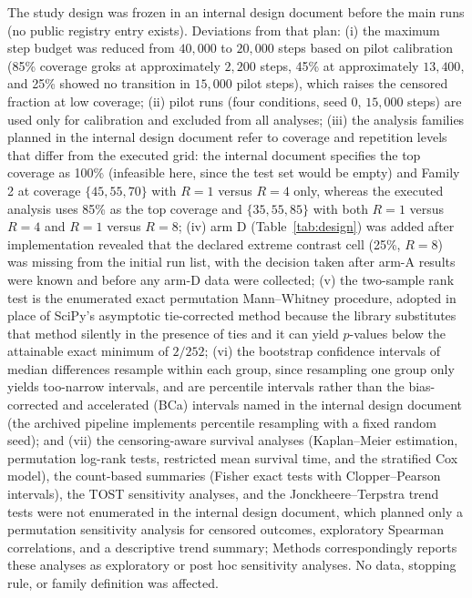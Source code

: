 \documentclass[10pt]{article}
\begin{document}
The study design was frozen in an internal design document before the main runs (no public registry entry exists). Deviations from that plan: (i) the maximum step budget was reduced from $40{,}000$ to $20{,}000$ steps based on pilot calibration (85\% coverage groks at approximately $2{,}200$ steps, 45\% at approximately $13{,}400$, and 25\% showed no transition in $15{,}000$ pilot steps), which raises the censored fraction at low coverage; (ii) pilot runs (four conditions, seed 0, $15{,}000$ steps) are used only for calibration and excluded from all analyses; (iii) the analysis families planned in the internal design document refer to coverage and repetition levels that differ from the executed grid: the internal document specifies the top coverage as 100\% (infeasible here, since the test set would be empty) and Family 2 at coverage $\{45,55,70\}$ with $R=1$ versus $R=4$ only, whereas the executed analysis uses 85\% as the top coverage and $\{35,55,85\}$ with both $R=1$ versus $R=4$ and $R=1$ versus $R=8$; (iv) arm D (Table~\ref{tab:design}) was added after implementation revealed that the declared extreme contrast cell (25\%, $R=8$) was missing from the initial run list, with the decision taken after arm-A results were known and before any arm-D data were collected; (v) the two-sample rank test is the enumerated exact permutation Mann--Whitney procedure, adopted in place of SciPy's asymptotic tie-corrected method because the library substitutes that method silently in the presence of ties and it can yield $p$-values below the attainable exact minimum of $2/252$; (vi) the bootstrap confidence intervals of median differences resample within each group, since resampling one group only yields too-narrow intervals, and are percentile intervals rather than the bias-corrected and accelerated (BCa) intervals named in the internal design document (the archived pipeline implements percentile resampling with a fixed random seed); and (vii) the censoring-aware survival analyses (Kaplan--Meier estimation, permutation log-rank tests, restricted mean survival time, and the stratified Cox model), the count-based summaries (Fisher exact tests with Clopper--Pearson intervals), the TOST sensitivity analyses, and the Jonckheere--Terpstra trend tests were not enumerated in the internal design document, which planned only a permutation sensitivity analysis for censored outcomes, exploratory Spearman correlations, and a descriptive trend summary; Methods correspondingly reports these analyses as exploratory or post hoc sensitivity analyses. No data, stopping rule, or family definition was affected.
\end{document}
